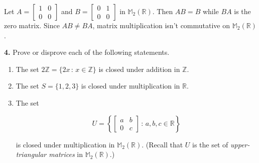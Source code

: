 \documentclass[10pt,]{book}
\theoremstyle{plain}
\theoremstyle{definition}
\theoremstyle{definition}
\theoremstyle{definition}
\theoremstyle{definition}
\numberwithin{equation}{section}
\def\Z{\mathbb{Z}}
\def\R{\mathbb{R}}
\def\M{\mathbb{M}}
\newcommand{\amp}{ & }
\begin{document}
      Let \(A=\begin{bmatrix}1 \amp 0 \\ 0 \amp 0\end{bmatrix}\) and \(B = \begin{bmatrix}0 \amp 1 \\ 0 \amp 0\end{bmatrix}\)
in \(\M_2(\R)\). Then \(AB=B\) while \(BA\) is the zero matrix. Since \(AB\neq BA\), matrix multiplication isn't commutative on \(\M_2(\R)\).
\par\smallskip
\noindent\textbf{4.}\quad{}
        Prove or disprove each of the following statements.
        \leavevmode%
\begin{enumerate}[label=(\alph*)]
\item\hypertarget{li-68}{}
              The set \(2\Z=\{2x\,:\,x\in \Z\}\) is closed under addition in \(\Z\).
\item\hypertarget{li-69}{}
              The set \(S=\{1,2,3\}\) is closed under multiplication in \(\R\).
\item\hypertarget{li-70}{}
              The set

%
\begin{equation*}
U=\left\{
\begin{bmatrix}
	a    \amp    b\\
	0 \amp c \end{bmatrix}\,:\,a,b,c\in \R\right\}
\end{equation*}


              is closed under multiplication in \(\M_2(\R)\). (Recall that \(U\) is  the set of \emph{upper-triangular matrices} in \(\M_2(\R)\).)
\end{enumerate}
\end{document}
